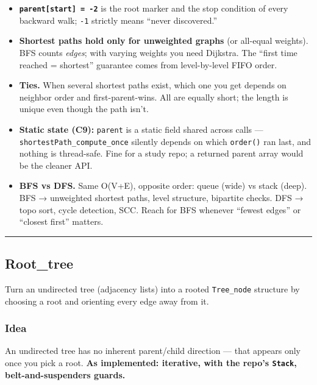 \documentclass[
  10pt,
  letterpaper,
  onecolumn]{article}
\providecommand{\tightlist}{%
  \setlength{\itemsep}{0pt}\setlength{\parskip}{0pt}}
\begin{document}
\begin{itemize}
\tightlist
\item
  \textbf{\texttt{parent{[}start{]}\ =\ -2}} is the root marker and the
  stop condition of every backward walk; \texttt{-1} strictly means
  ``never discovered.''
\item
  \textbf{Shortest paths hold only for unweighted graphs} (or all-equal
  weights). BFS counts \emph{edges}; with varying weights you need
  Dijkstra. The ``first time reached = shortest'' guarantee comes from
  level-by-level FIFO order.
\item
  \textbf{Ties.} When several shortest paths exist, which one you get
  depends on neighbor order and first-parent-wins. All are equally
  short; the length is unique even though the path isn't.
\item
  \textbf{Static state (C9):} \texttt{parent} is a static field shared
  across calls --- \texttt{shortestPath\_compute\_once} silently depends
  on which \texttt{order()} ran last, and nothing is thread-safe. Fine
  for a study repo; a returned parent array would be the cleaner API.
\item
  \textbf{BFS vs DFS.} Same O(V+E), opposite order: queue (wide) vs
  stack (deep). BFS → unweighted shortest paths, level structure,
  bipartite checks. DFS → topo sort, cycle detection, SCC. Reach for BFS
  whenever ``fewest edges'' or ``closest first'' matters.
\end{itemize}

\begin{center}\rule{0.5\linewidth}{0.5pt}\end{center}

\hypertarget{root_tree}{%
\subsection{Root\_tree}\label{root_tree}}

Turn an undirected tree (adjacency lists) into a rooted
\texttt{Tree\_node} structure by choosing a root and orienting every
edge away from it.

\hypertarget{idea-9}{%
\subsubsection{Idea}\label{idea-9}}

An undirected tree has no inherent parent/child direction --- that
appears only once you pick a root. \textbf{As implemented: iterative,
with the repo's \texttt{Stack}, belt-and-suspenders guards.}
\end{document}

